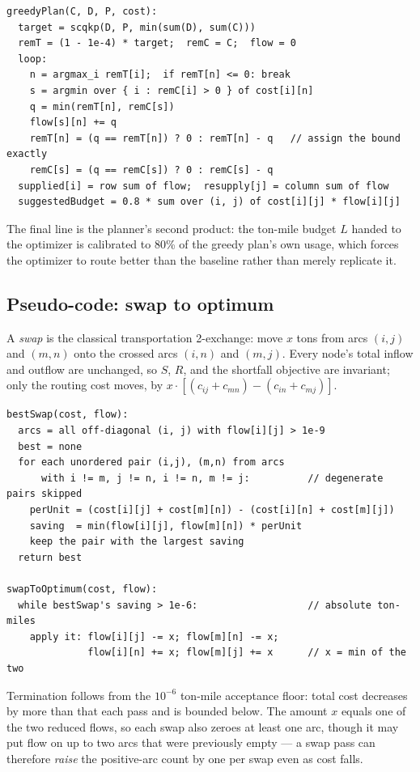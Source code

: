 \begin{lstlisting}
greedyPlan(C, D, P, cost):
  target = scqkp(D, P, min(sum(D), sum(C)))
  remT = (1 - 1e-4) * target;  remC = C;  flow = 0
  loop:
    n = argmax_i remT[i];  if remT[n] <= 0: break
    s = argmin over { i : remC[i] > 0 } of cost[i][n]
    q = min(remT[n], remC[s])
    flow[s][n] += q
    remT[n] = (q == remT[n]) ? 0 : remT[n] - q   // assign the bound exactly
    remC[s] = (q == remC[s]) ? 0 : remC[s] - q
  supplied[i] = row sum of flow;  resupply[j] = column sum of flow
  suggestedBudget = 0.8 * sum over (i, j) of cost[i][j] * flow[i][j]
\end{lstlisting}

The final line is the planner's second product: the ton-mile budget $L$
handed to the optimizer is calibrated to 80\% of the greedy plan's own
usage, which forces the optimizer to route better than the baseline
rather than merely replicate it.

\subsection{Pseudo-code: swap to optimum}
\label{sec:t-swap-pseudo}

A \emph{swap} is the classical transportation 2-exchange: move $x$ tons
from arcs $(i,j)$ and $(m,n)$ onto the crossed arcs $(i,n)$ and $(m,j)$.
Every node's total inflow and outflow are unchanged, so $S$, $R$, and the
shortfall objective are invariant; only the routing cost moves, by
$x \cdot \left[(c_{ij} + c_{mn}) - (c_{in} + c_{mj})\right]$.

\begin{lstlisting}
bestSwap(cost, flow):
  arcs = all off-diagonal (i, j) with flow[i][j] > 1e-9
  best = none
  for each unordered pair (i,j), (m,n) from arcs
      with i != m, j != n, i != n, m != j:          // degenerate pairs skipped
    perUnit = (cost[i][j] + cost[m][n]) - (cost[i][n] + cost[m][j])
    saving  = min(flow[i][j], flow[m][n]) * perUnit
    keep the pair with the largest saving
  return best

swapToOptimum(cost, flow):
  while bestSwap's saving > 1e-6:                   // absolute ton-miles
    apply it: flow[i][j] -= x; flow[m][n] -= x;
              flow[i][n] += x; flow[m][j] += x      // x = min of the two
\end{lstlisting}

Termination follows from the $10^{-6}$ ton-mile acceptance floor: total
cost decreases by more than that each pass and is bounded below. The
amount $x$ equals one of the two reduced flows, so each swap also zeroes
at least one arc, though it may put flow on up to two arcs that were
previously empty --- a swap pass can therefore \emph{raise} the
positive-arc count by one per swap even as cost falls.

